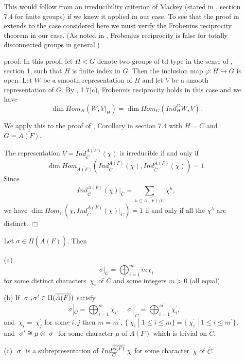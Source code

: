 \begin{remark}
This would follow from an irreducibility criterion of Mackey (stated in
\cite{Se}, section 7.4 for finite groups) if we knew it applied in
our case. To see
that the proof in \cite{Se} extends to the case
considered here we must verify
the Frobenius reciprocity theorem in our case. (As noted in
\cite{C}, Frobenius
reciprocity is false for totally disconnected groups in general.) 
\end{remark}

{\sf proof:} In this proof, let $H<G$ denote
two groups of td type in the sense of \cite{C}, section 1,
such that $H$ is finite index in $G$. Then the inclusion map 
$\varphi :H\hookrightarrow G$ is open. Let $W$ be a smooth representation of 
$H$ and let $V$ be a smooth representation of $G$. By \cite{C}, 1.7(c),
Frobenuis reciprocity holds in this case and we have
\begin{equation}
\dim Hom_H(W,V|_H)=\dim Hom_G(Ind_H^GW,V).
\end{equation}

We apply this to the proof of \cite{Se}, Corollary in section 7.4
with $H=\overline{C}$ and $G=\overline{A(F)}$. 

The representation $V=Ind_{\overline{C}}^{\overline{A(F)}}(\chi )$ is
irreducible if and only if
\[\dim Hom_{\overline{A(F)}}(Ind_{\overline{C}}^{\overline{A(F)}}(\chi ),
Ind_{\overline{C}}^{\overline{A(F)}}(\chi ))=1.
\]
Since 
\begin{equation}
Ind_{\overline{C}}^{\overline{A(F)}}(\chi )|_{\overline{C}}=\sum_{h\in 
\overline{A(F)}/\overline{C}}\chi ^h,
\end{equation}
we have $\dim Hom_{\overline{C}}(\chi ,Ind_{\overline{C}}^{\overline{A(F)}%
}(\chi )|_{\overline{C}})=1$ if and only if all the $\chi ^h$ are distinct. $%
\Box $

\begin{lemma}
Let $\sigma \in \Pi (\overline{A(F)})$. Then

(a) 
\[
\sigma |_{\overline{C}}=\bigoplus_{i=1}^mm\chi _i
\]
for some distinct characters $\ \chi _i$ of $\overline{C}$ and some integers 
$m>0$ (all equal).

(b) If $\ \sigma {\rm \;},\sigma ^{\prime }\in \Pi (\overline{A(F)})$
satisfy 
\[
\sigma |_{\overline{C}}=\bigoplus_{i=1}^m\chi _i,
\;\;\;\;\sigma ^{\prime }|_{\overline{C}}
=\bigoplus_{i=1}^{m^{\prime }}\chi _i^{\prime },\;\;
\]
and $\ \chi _i=\ \chi _j^{\prime }$ for some $i,j$ then $m=m^{\prime }$,
$\{\ \chi _i\;|\;1\leq i\leq m\}=\{\ \chi _i^{\prime }\;|\;1\leq i\leq
m^{\prime }\}$, and
$\ \sigma ^{\prime }\cong \mu \otimes \ \sigma {\rm \;}$
for some character $\mu $ of $\overline{A(F)}$ which is trivial
on $\overline{C}$.

(c) $\ \sigma {\rm \;}$ is a subrepresentation of $Ind_{\overline{C}}^{%
\overline{A(F)}}\ \chi $ for some character $\ \chi $ of $\overline{C}$.
\end{lemma}

